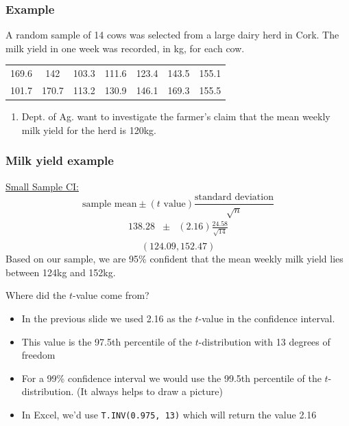 \documentclass[12pt,xcolor=dvipsnames,handout,mathserif,aspectratio=169]{beamer}
\begin{document}
\begin{frame}\frametitle{Example}
A random sample of 14 cows was selected from a large dairy herd in Cork. The milk yield in one week was recorded, in kg, for each cow. \\
\vspace{0.5cm}
\begin{tabular}{ccccccc}
169.6&142&103.3&111.6&123.4&143.5&155.1\\
101.7&170.7&113.2&130.9&146.1&169.3&155.5
\end{tabular}
\vspace{0.5cm}

\begin{enumerate}
\item Dept. of Ag. want to investigate the farmer's claim that the mean weekly milk yield for the herd is 120kg.
\end{enumerate}
\end{frame}


\begin{frame}\frametitle{Milk yield example}
\underline{Small Sample CI:}\\
$$\mbox{sample mean} \pm (\mbox{$t$ value}) \frac{\mbox{standard deviation}}{\sqrt{n}}$$
\begin{eqnarray*}
138.28 & \pm & (2.16) \frac{24.58}{\sqrt{14}}\\
\end{eqnarray*}
$$(124.09, 152.47)$$
Based on our sample, we are 95\% confident that the mean weekly milk yield lies between 124kg and 152kg.
\end{frame}

\begin{frame}{Where did the $t$-value come from?}

\begin{itemize}
\item In the previous slide we used 2.16 as the $t$-value in the confidence interval. 
\item This value is the 97.5th percentile of the $t$-distribution with 13 degrees of freedom
\item For a 99\% confidence interval we would use the 99.5th percentile of the $t$-distribution. (It always helps to draw a picture)
\item In Excel, we'd use \texttt{T.INV(0.975, 13)} which will return the value 2.16
\end{itemize}

\end{frame}
\end{document}
